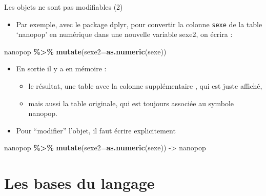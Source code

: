 \documentclass[
  ignorenonframetext,
]{beamer}
\newenvironment{Shaded}{\begin{snugshade}}{\end{snugshade}}
\newcommand{\AttributeTok}[1]{\textcolor[rgb]{0.13,0.29,0.53}{#1}}
\newcommand{\FunctionTok}[1]{\textcolor[rgb]{0.13,0.29,0.53}{\textbf{#1}}}
\newcommand{\NormalTok}[1]{#1}
\newcommand{\OtherTok}[1]{\textcolor[rgb]{0.56,0.35,0.01}{#1}}
\newcommand{\SpecialCharTok}[1]{\textcolor[rgb]{0.81,0.36,0.00}{\textbf{#1}}}
\providecommand{\tightlist}{%
  \setlength{\itemsep}{0pt}\setlength{\parskip}{0pt}}
\begin{document}
\begin{frame}[fragile]{Les objets ne sont pas modifiables (2)}
\protect\hypertarget{les-objets-ne-sont-pas-modifiables-2}{}
\begin{itemize}
\tightlist
\item
  Par exemple, avec le package dplyr, pour convertir la colonne
  \texttt{sexe} de la table `nanopop' en numérique dans une nouvelle
  variable sexe2, on écrira :
\end{itemize}

\tiny

\begin{Shaded}
\begin{Highlighting}[]
\NormalTok{nanopop }\SpecialCharTok{\%\textgreater{}\%} \FunctionTok{mutate}\NormalTok{(}\AttributeTok{sexe2=}\FunctionTok{as.numeric}\NormalTok{(sexe))}
\end{Highlighting}
\end{Shaded}

\normalsize

\begin{itemize}
\tightlist
\item
  En sortie il y a en mémoire :

  \begin{itemize}
  \tightlist
  \item
    le résultat, une table avec la colonne supplémentaire , qui est
    juste affiché,
  \item
    mais aussi la table originale, qui est toujours associée au symbole
    nanopop.
  \end{itemize}
\item
  Pour ``modifier'' l'objet, il faut écrire explicitement
\end{itemize}

\tiny

\begin{Shaded}
\begin{Highlighting}[]
\NormalTok{nanopop }\SpecialCharTok{\%\textgreater{}\%} \FunctionTok{mutate}\NormalTok{(}\AttributeTok{sexe2=}\FunctionTok{as.numeric}\NormalTok{(sexe)) }\OtherTok{{-}\textgreater{}}\NormalTok{ nanopop}
\end{Highlighting}
\end{Shaded}

\normalsize
\end{frame}

\hypertarget{les-bases-du-langage}{%
\section{Les bases du langage}\label{les-bases-du-langage}}
\end{document}
